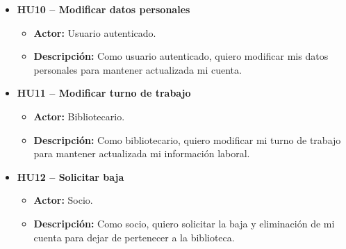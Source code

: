 \begin{itemize}
	\item \textbf{HU10 -- Modificar datos personales}
	\begin{itemize}
		\item \textbf{Actor:} Usuario autenticado.
		\item \textbf{Descripción:} Como usuario autenticado, quiero modificar mis datos personales para mantener actualizada mi cuenta.
	\end{itemize}
	
	\item \textbf{HU11 -- Modificar turno de trabajo}
	\begin{itemize}
		\item \textbf{Actor:} Bibliotecario.
		\item \textbf{Descripción:} Como bibliotecario, quiero modificar mi turno de trabajo para mantener actualizada mi información laboral.
	\end{itemize}
	
	\item \textbf{HU12 -- Solicitar baja}
	\begin{itemize}
		\item \textbf{Actor:} Socio.
		\item \textbf{Descripción:} Como socio, quiero solicitar la baja y eliminación de mi cuenta para dejar de pertenecer a la biblioteca.
	\end{itemize}
\end{itemize}

